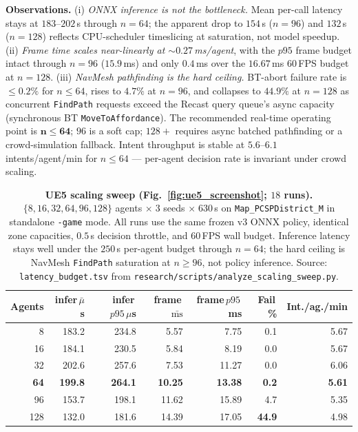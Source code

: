 \documentclass[conference]{IEEEtran}
\begin{document}
\textbf{Observations.}
(i) \emph{ONNX inference is not the bottleneck.} Mean per-call latency
stays at $183$--$202$\,\textmu s through $n{=}64$; the apparent drop to
$154$\,\textmu s ($n{=}96$) and $132$\,\textmu s ($n{=}128$) reflects
CPU-scheduler timeslicing at saturation, not model speedup.
(ii) \emph{Frame time scales near-linearly at $\sim\!0.27$\,ms/agent},
with the $p95$ frame budget intact through $n{=}96$ ($15.9$\,ms) and only
$0.4$\,ms over the $16.67$\,ms $60$\,FPS budget at $n{=}128$.
(iii) \emph{NavMesh pathfinding is the hard ceiling.} BT-abort failure
rate is $\leq\!0.2\%$ for $n{\leq}64$, rises to $4.7\%$ at $n{=}96$, and
collapses to $\mathbf{44.9\%}$ at $n{=}128$ as concurrent
\texttt{FindPath} requests exceed the Recast query queue's async capacity
(synchronous BT \texttt{MoveToAffordance}). The recommended real-time
operating point is $\boldsymbol{n{\leq}64}$; $96$ is a soft cap;
$128{+}$ requires async batched pathfinding or a crowd-simulation
fallback. Intent throughput is stable at $5.6$--$6.1$ intents/agent/min
for $n{\leq}64$ --- per-agent decision rate is invariant under crowd
scaling.

\begin{table}[t]
  \centering
  \small
  \caption{%
    \textbf{UE5 scaling sweep (Fig.~\ref{fig:ue5_screenshot}; $18$ runs).}
    $\{8,16,32,64,96,128\}$ agents $\times\;3$ seeds $\times\;630$\,s on
    \texttt{Map\_PCSPDistrict\_M} in standalone \texttt{-game} mode.
    All runs use the same frozen v3 ONNX policy, identical zone
    capacities, $0.5$\,s decision throttle, and $60$\,FPS wall budget.
    Inference latency stays well under the $250$\,\textmu s per-agent budget
    through $n{=}64$; the hard ceiling is NavMesh \texttt{FindPath}
    saturation at $n{\geq}96$, not policy inference.
    Source: \texttt{latency\_budget.tsv} from
    \texttt{research/scripts/analyze\_scaling\_sweep.py}.}
  \label{tab:ue5_scaling}
  \setlength{\tabcolsep}{2pt}
  \scriptsize
  \begin{tabular}{rrrrrrr}
    \toprule
    Agents & infer\,$\bar{\mu}$s & infer\,$p95\,\mu$s & frame\,$\bar{\text{ms}}$ & frame\,$p95$\,ms & Fail\,\% & Int./ag./min \\
    \midrule
    8   & 183.2 & 234.8 &  5.57 &  7.75 &  0.1 & 5.67 \\
    16  & 184.1 & 230.5 &  5.84 &  8.19 &  0.0 & 5.67 \\
    32  & 202.6 & 257.6 &  7.53 & 11.27 &  0.0 & 6.06 \\
    \textbf{64}  & \textbf{199.8} & \textbf{264.1} & \textbf{10.25} & \textbf{13.38} & \textbf{0.2} & \textbf{5.61} \\
    96  & 153.7 & 198.1 & 11.62 & 15.89 &  4.7 & 5.35 \\
    128 & 132.0 & 181.6 & 14.39 & 17.05 & \textbf{44.9} & 4.98 \\
    \bottomrule
  \end{tabular}
\end{table}

\clearpage


\end{document}

